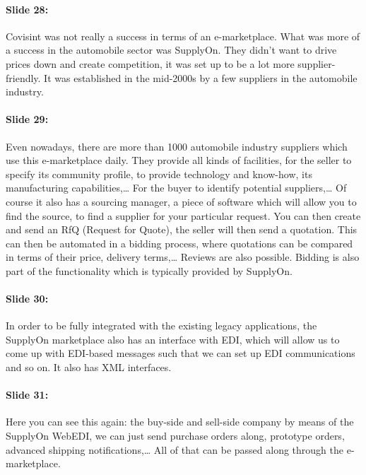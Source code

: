 \documentclass[10pt,a4paper]{report}
\begin{document}
\paragraph{Slide 28:}Covisint was not really a success in terms of an e-marketplace. What was more of a success in the automobile sector was SupplyOn. They didn't want to drive prices down and create competition, it was set up to be a lot more supplier-friendly. It was established in the mid-2000s by a few suppliers in the automobile industry.

\paragraph{Slide 29:}Even nowadays, there are more than 1000 automobile industry suppliers which use this e-marketplace daily. They provide all kinds of facilities, for the seller to specify its community profile, to provide technology and know-how, its manufacturing capabilities,… For the buyer to identify potential suppliers,… Of course it also has a sourcing manager, a piece of software which will allow you to find the source, to find a supplier for your particular request. You can then create and send an RfQ (Request for Quote), the seller will then send a quotation. This can then be automated in a bidding process, where quotations can be compared in terms of their price, delivery terms,… Reviews are also possible.
Bidding is also part of the functionality which is typically provided by SupplyOn.

\paragraph{Slide 30:}In order to be fully integrated with the existing legacy applications, the SupplyOn marketplace also has an interface with EDI, which will allow us to come up with EDI-based messages such that we can set up EDI communications and so on. It also has XML interfaces. 

\paragraph{Slide 31:}Here you can see this again: the buy-side and sell-side company by means of the SupplyOn WebEDI, we can just send purchase orders along, prototype orders, advanced shipping notifications,… All of that can be passed along through the e-marketplace.
\end{document}
